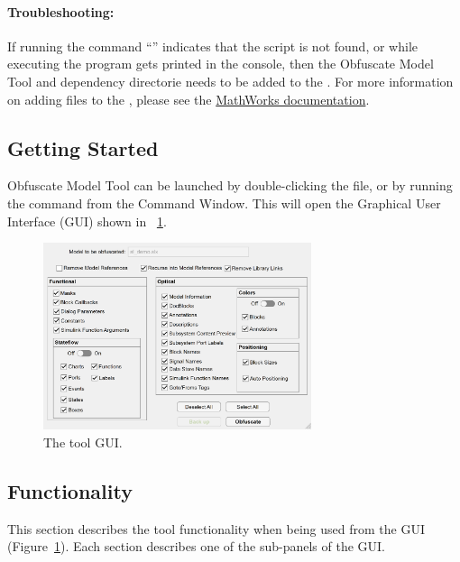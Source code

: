 \documentclass{article}
\makeatletter
\newcommand{\ToolName}{Obfuscate Model Tool\@\xspace}
\makeatother
\begin{document}
\paragraph{Troubleshooting:} If running the command ``'' indicates that the script is not found, or while executing the program  gets printed in the console, then the \ToolName and dependency directorie needs to be added to the \mpath. For more information on adding files to the \mpath, please see the \href{https://www.mathworks.com/help/matlab/matlab_env/add-remove-or-reorder-folders-on-the-search-path.html}{MathWorks documentation}.

\subsection{Getting Started}
\ToolName can be launched by double-clicking the  file, or by running the command  from the Command Window. This will open the Graphical User Interface (GUI) shown in \figurename~\ref{fig:contextMenu}.

\begin{figure}[htb!]
	\centering
	\includegraphics[width=0.7\textwidth]{../figs/GUI}
	\caption{The tool GUI.}
	\label{fig:contextMenu}
\end{figure}

\newpage
\subsection{Functionality}
This section describes the tool functionality when being used from the GUI (Figure~\ref{fig:contextMenu}). Each section describes one of the sub-panels of the GUI.
\end{document}
